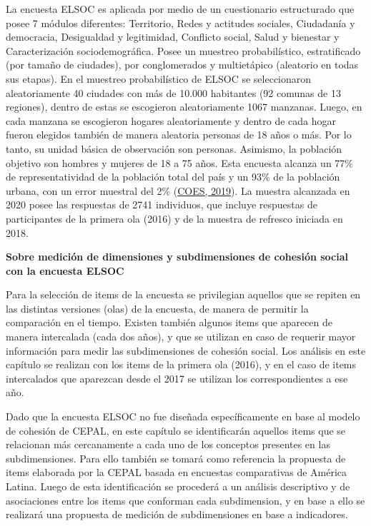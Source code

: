 \documentclass[
  12pt,
]{book}
\begin{document}
La encuesta ELSOC es aplicada por medio de un cuestionario estructurado que posee 7 módulos diferentes: Territorio, Redes y actitudes sociales, Ciudadanía y democracia, Desigualdad y legitimidad, Conflicto social, Salud y bienestar y Caracterización sociodemográfica. Posee un muestreo probabilístico, estratificado (por tamaño de ciudades), por conglomerados y multietápico (aleatorio en todas sus etapas). En el muestreo probabilístico de ELSOC se seleccionaron aleatoriamente 40 ciudades con más de 10.000 habitantes (92 comunas de 13 regiones), dentro de estas se escogieron aleatoriamente 1067 manzanas. Luego, en cada manzana se escogieron hogares aleatoriamente y dentro de cada hogar fueron elegidos también de manera aleatoria personas de 18 años o más. Por lo tanto, su unidad básica de observación son personas. Asimismo, la población objetivo son hombres y mujeres de 18 a 75 años. Esta encuesta alcanza un 77\% de representatividad de la población total del país y un 93\% de la población urbana, con un error muestral del 2\% (\protect\hyperlink{ref-coes_radiografia_2019}{COES, 2019}). La muestra alcanzada en 2020 posee las respuestas de 2741 individuos, que incluye respuestas de participantes de la primera ola (2016) y de la muestra de refresco iniciada en 2018.

\textbf{Sobre medición de dimensiones y subdimensiones de cohesión social con la encuesta ELSOC}

Para la selección de items de la encuesta se privilegian aquellos que se repiten en las distintas versiones (olas) de la encuesta, de manera de permitir la comparación en el tiempo. Existen también algunos items que aparecen de manera intercalada (cada dos años), y que se utilizan en caso de requerir mayor información para medir las subdimensiones de cohesión social. Los análisis en este capítulo se realizan con los items de la primera ola (2016), y en el caso de items intercalados que aparezcan desde el 2017 se utilizan los correspondientes a ese año.

Dado que la encuesta ELSOC no fue diseñada específicamente en base al modelo de cohesión de CEPAL, en este capítulo se identificarán aquellos items que se relacionan más cercanamente a cada uno de los conceptos presentes en las subdimensiones. Para ello también se tomará como referencia la propuesta de items elaborada por la CEPAL basada en encuestas comparativas de América Latina. Luego de esta identificación se procederá a un análisis descriptivo y de asociaciones entre los items que conforman cada subdimension, y en base a ello se realizará una propuesta de medición de subdimensiones en base a indicadores.
\end{document}
